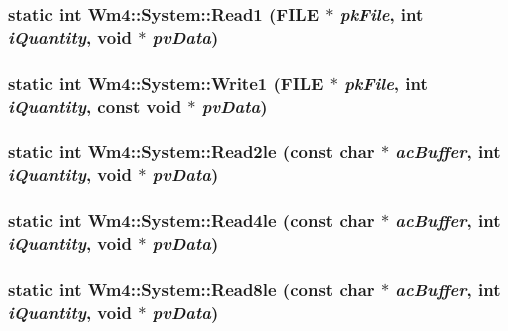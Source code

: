 \subsubsection{\setlength{\rightskip}{0pt plus 5cm}static int Wm4::System::Read1 (FILE $\ast$ {\em pk\-File}, int {\em i\-Quantity}, void $\ast$ {\em pv\-Data})\hspace{0.3cm}{\tt  [static]}}\label{classWm4_1_1System_da908e9cee1c5b0bf03226c0e6962903}


\subsubsection{\setlength{\rightskip}{0pt plus 5cm}static int Wm4::System::Write1 (FILE $\ast$ {\em pk\-File}, int {\em i\-Quantity}, const void $\ast$ {\em pv\-Data})\hspace{0.3cm}{\tt  [static]}}\label{classWm4_1_1System_7946715d85089968263403237a26a2d8}


\subsubsection{\setlength{\rightskip}{0pt plus 5cm}static int Wm4::System::Read2le (const char $\ast$ {\em ac\-Buffer}, int {\em i\-Quantity}, void $\ast$ {\em pv\-Data})\hspace{0.3cm}{\tt  [static]}}\label{classWm4_1_1System_f0cfb2eb4eb6ed377cfa931e1ee5e638}


\subsubsection{\setlength{\rightskip}{0pt plus 5cm}static int Wm4::System::Read4le (const char $\ast$ {\em ac\-Buffer}, int {\em i\-Quantity}, void $\ast$ {\em pv\-Data})\hspace{0.3cm}{\tt  [static]}}\label{classWm4_1_1System_f6479ef6fa649750609932f07306f94d}


\subsubsection{\setlength{\rightskip}{0pt plus 5cm}static int Wm4::System::Read8le (const char $\ast$ {\em ac\-Buffer}, int {\em i\-Quantity}, void $\ast$ {\em pv\-Data})\hspace{0.3cm}{\tt  [static]}}\label{classWm4_1_1System_8d67e3b6439180d7a224bca9f18b54e7}


